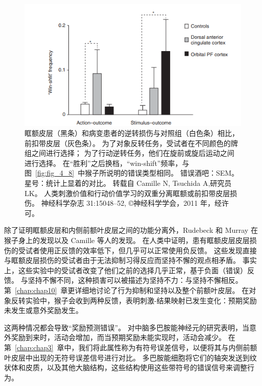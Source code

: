 \begin{figure}[!htb]
	\centering
	\includegraphics{image_pfc/Fig_4_9}
	\caption{眶额皮层（黑条）和病变患者的逆转损伤与对照组（白色条）相比，前扣带皮层（灰色条）。
		为了对象反转任务，受试者在不同颜色的牌组之间进行选择；
		为了行动逆转任务，他们在旋前或旋后运动之间进行选择。
		在“胜利”之后换档，“win-shift”频率，与图~\ref{fig:fig_4_8}~中猴子所说明的错误类型相同。
		错误酒吧：SEM。
		星号：统计上显着的对比。
		转载自 Camille N, Tsuchida A,研究员LK。
		人类刺激价值和行动价值学习的双重分离眶额或前扣带皮层损伤。
		神经科学杂志 31:15048–52, ©神经科学学会，2011 年，经许可。}
	\label{fig:fig_4_9}
\end{figure}


除了证明眶额皮层和内侧前额叶皮层之间的功能分离外，Rudebeck 和 Murray 在猴子身上的发现以及 Camille 等人的发现。
在人类中证明，患有眶额皮层皮层损伤的受试者使用正反馈的效率低下，但几乎可以正常使用负反馈。
这些发现直接与眶额皮层损伤的受试者由于无法抑制习得反应而坚持不懈的观点相矛盾。
事实上，这些实验中的受试者改变了他们之前的选择几乎正常，基于负面（错误）反馈。
与坚持不懈不同，这种损害可以被描述为坚持不力：与坚持不懈相反。
第~\ref{chap:chap10}~章更详细地讨论了行为抑制和坚持以及整个前额叶皮层。
在对象反转实验中，猴子会收到两种反馈，表明刺激-结果映射已发生变化：预期奖励未发生或意外奖励发生。\par
这两种情况都会导致“奖励预测错误”\cite{schultz2000neuronal}。
对中脑多巴胺能神经元的研究表明，当意外奖励到来时，活动会增加，而当预期奖励未能实现时，活动会减少\cite{schultz1998predictive}。
在第~\ref{chap:chap3}~章中，我们将此属性称为有符号误差信号，以便将其与内侧前额叶皮层中出现的无符号误差信号进行对比。
多巴胺能细胞将它们的轴突发送到纹状体和皮质，以及其他大脑结构，这些结构使用这些带符号的错误信号来调整行为。\par


